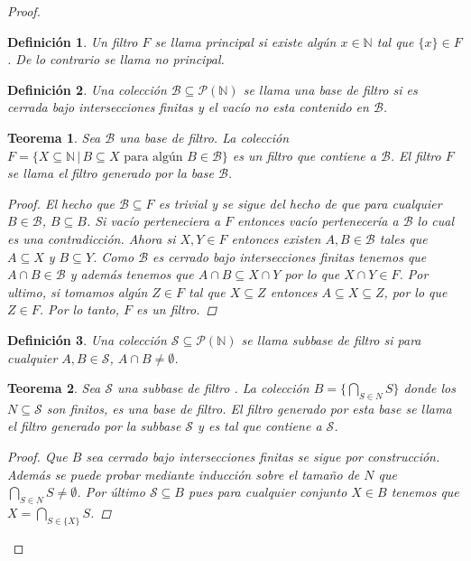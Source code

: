 \documentclass[letter,twoside,12pt]{article}
\newtheorem{theo}{Teorema}
\newtheorem*{defi}{Definición}
\begin{document}
\begin{enumerate}
\begin{proof}
\begin{defi}
Un filtro $ F $ se llama principal si existe algún $ x \in \mathbb{N} $ tal que $ \{ x\} \in F $. De lo contrario se llama no principal.
\end{defi}

\begin{defi}
Una colección $ \mathcal{B} \subseteq \mathcal{P}(\mathbb{N}) $ se llama una base de filtro si es cerrada bajo intersecciones finitas y el vacío no esta contenido en $ \mathcal{B} $.
\end{defi}

\begin{theo}
Sea $ \mathcal{B} $ una base de filtro. La colección $ F = \{X \subseteq \mathbb{N}\,|\, B \subseteq X \text{ para algún } B \in \mathcal{B} \}$ es un filtro que contiene a $ \mathcal{B} $. El filtro $ F $ se llama el filtro generado por la base $ \mathcal{B} $. 
\begin{proof}
El hecho que $ \mathcal{B} \subseteq F $ es trivial y se sigue del hecho de que para cualquier $ B \in \mathcal{B} $, $ B \subseteq B $. Si vacío perteneciera a $ F $ entonces vacío pertenecería a $ \mathcal {B} $ lo cual es una contradicción. Ahora si $ X,Y \in F $ entonces existen $ A,B \in \mathcal{B} $ tales que $ A \subseteq X $ y $ B \subseteq Y $. Como $ \mathcal{B} $ es cerrado bajo intersecciones finitas tenemos que $ A \cap B \in \mathcal{B}$ y además tenemos que $ A \cap B \subseteq X \cap Y $ por lo que $ X \cap Y \in F$. Por ultimo, si tomamos algún $ Z \in F $ tal que $ X \subseteq Z $ entonces $ A \subseteq X \subseteq Z $, por lo que $ Z \in F $. Por lo tanto, $ F $ es un filtro.
\end{proof}
\end{theo}
\begin{defi}
Una colección $ \mathcal{S} \subseteq \mathcal{P}(\mathbb{N})$ se llama subbase de filtro si para cualquier $ A,B \in \mathcal{S} $, $ A \cap B \not = \emptyset$.
\end{defi}

\begin{theo}
Sea $ \mathcal{S} $ una subbase de filtro . La colección $ B = \{\bigcap_{S \in N} S\}  $ donde los $ N \subseteq \mathcal{S} $ son finitos, es una base de filtro. El filtro generado por esta base se llama el filtro generado por la subbase $ \mathcal{S} $ y es tal que contiene a $ \mathcal{S} $. 
\begin{proof}
Que $ B $ sea cerrado bajo intersecciones finitas se sigue por construcción. Además se puede probar mediante inducción sobre el tamaño de $ N $ que $ \bigcap_{S \in N} S \not = \emptyset $. Por último $ \mathcal{S} \subseteq B$ pues para cualquier conjunto $ X \in B $ tenemos que $ X = \bigcap_{S \in \{X\}} S $.
\end{proof}
\end{theo}


\end{proof}
\end{enumerate}
\end{document}
